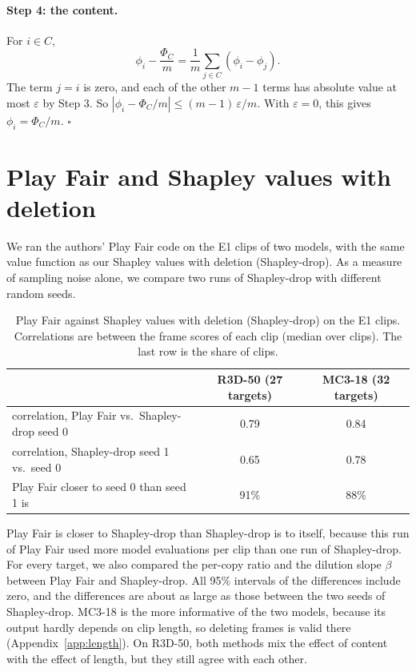 \paragraph{Step 4: the content.}
For $i \in C$,
\begin{equation*}
  \phi_i - \frac{\Phi_C}{m} = \frac{1}{m} \sum_{j \in C} (\phi_i - \phi_j).
\end{equation*}
The term $j = i$ is zero, and each of the other $m - 1$ terms has absolute value at most $\varepsilon$ by Step 3.
So $|\phi_i - \Phi_C / m| \le (m - 1)\,\varepsilon / m$.
With $\varepsilon = 0$, this gives $\phi_i = \Phi_C / m$. \hfill $\square$

\section{Play Fair and Shapley values with deletion}
\label{app:playfair}


We ran the authors' Play Fair code on the E1 clips of two models, with the same value function as our Shapley values with deletion (Shapley-drop).
As a measure of sampling noise alone, we compare two runs of Shapley-drop with different random seeds.

\begin{table}[h]
\centering
\caption{Play Fair against Shapley values with deletion (Shapley-drop) on the E1 clips. Correlations are between the frame scores of each clip (median over clips). The last row is the share of clips.}
\label{tab:playfair}
\begin{tabular}{lcc}
\toprule
 & R3D-50 (27 targets) & MC3-18 (32 targets) \\
\midrule
correlation, Play Fair vs.\ Shapley-drop seed 0 & 0.79 & 0.84 \\
correlation, Shapley-drop seed 1 vs.\ seed 0 & 0.65 & 0.78 \\
Play Fair closer to seed 0 than seed 1 is & 91\% & 88\% \\
\bottomrule
\end{tabular}
\end{table}

Play Fair is closer to Shapley-drop than Shapley-drop is to itself, because this run of Play Fair used more model evaluations per clip than one run of Shapley-drop.
For every target, we also compared the per-copy ratio and the dilution slope $\beta$ between Play Fair and Shapley-drop.
All 95\% intervals of the differences include zero, and the differences are about as large as those between the two seeds of Shapley-drop.
MC3-18 is the more informative of the two models, because its output hardly depends on clip length, so deleting frames is valid there (Appendix~\ref{app:length}).
On R3D-50, both methods mix the effect of content with the effect of length, but they still agree with each other.

